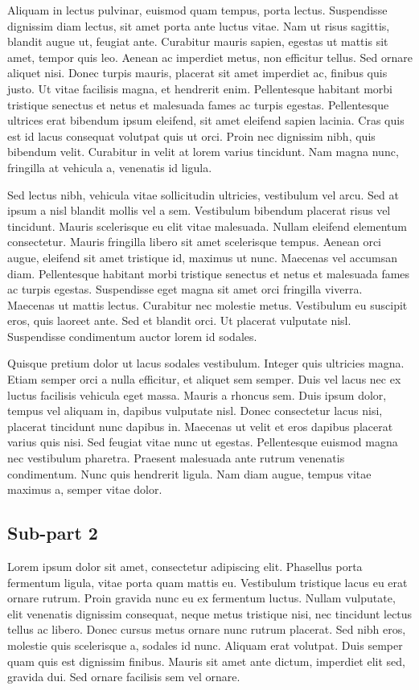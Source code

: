 \documentclass[a4paper,15pt]{article}
\begin{document}
Aliquam in lectus pulvinar, euismod quam tempus, porta lectus. Suspendisse dignissim diam lectus, sit amet porta ante luctus vitae. Nam ut risus sagittis, blandit augue ut, feugiat ante. Curabitur mauris sapien, egestas ut mattis sit amet, tempor quis leo. Aenean ac imperdiet metus, non efficitur tellus. Sed ornare aliquet nisi. Donec turpis mauris, placerat sit amet imperdiet ac, finibus quis justo. Ut vitae facilisis magna, et hendrerit enim. Pellentesque habitant morbi tristique senectus et netus et malesuada fames ac turpis egestas. Pellentesque ultrices erat bibendum ipsum eleifend, sit amet eleifend sapien lacinia. Cras quis est id lacus consequat volutpat quis ut orci. Proin nec dignissim nibh, quis bibendum velit. Curabitur in velit at lorem varius tincidunt. Nam magna nunc, fringilla at vehicula a, venenatis id ligula.

Sed lectus nibh, vehicula vitae sollicitudin ultricies, vestibulum vel arcu. Sed at ipsum a nisl blandit mollis vel a sem. Vestibulum bibendum placerat risus vel tincidunt. Mauris scelerisque eu elit vitae malesuada. Nullam eleifend elementum consectetur. Mauris fringilla libero sit amet scelerisque tempus. Aenean orci augue, eleifend sit amet tristique id, maximus ut nunc. Maecenas vel accumsan diam. Pellentesque habitant morbi tristique senectus et netus et malesuada fames ac turpis egestas. Suspendisse eget magna sit amet orci fringilla viverra. Maecenas ut mattis lectus. Curabitur nec molestie metus. Vestibulum eu suscipit eros, quis laoreet ante. Sed et blandit orci. Ut placerat vulputate nisl. Suspendisse condimentum auctor lorem id sodales.

Quisque pretium dolor ut lacus sodales vestibulum. Integer quis ultricies magna. Etiam semper orci a nulla efficitur, et aliquet sem semper. Duis vel lacus nec ex luctus facilisis vehicula eget massa. Mauris a rhoncus sem. Duis ipsum dolor, tempus vel aliquam in, dapibus vulputate nisl. Donec consectetur lacus nisi, placerat tincidunt nunc dapibus in. Maecenas ut velit et eros dapibus placerat varius quis nisi. Sed feugiat vitae nunc ut egestas. Pellentesque euismod magna nec vestibulum pharetra. Praesent malesuada ante rutrum venenatis condimentum. Nunc quis hendrerit ligula. Nam diam augue, tempus vitae maximus a, semper vitae dolor.

\subsection{Sub-part 2}

Lorem ipsum dolor sit amet, consectetur adipiscing elit. Phasellus porta fermentum ligula, vitae porta quam mattis eu. Vestibulum tristique lacus eu erat ornare rutrum. Proin gravida nunc eu ex fermentum luctus. Nullam vulputate, elit venenatis dignissim consequat, neque metus tristique nisi, nec tincidunt lectus tellus ac libero. Donec cursus metus ornare nunc rutrum placerat. Sed nibh eros, molestie quis scelerisque a, sodales id nunc. Aliquam erat volutpat. Duis semper quam quis est dignissim finibus. Mauris sit amet ante dictum, imperdiet elit sed, gravida dui. Sed ornare facilisis sem vel ornare.
\end{document}
